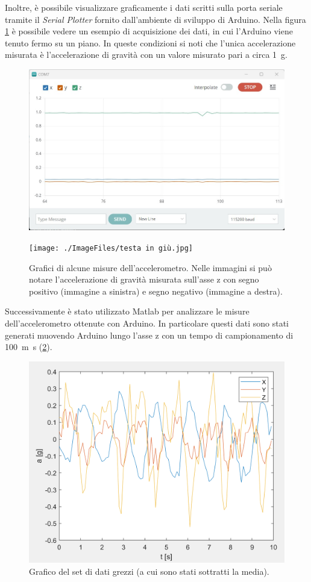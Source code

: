 Inoltre, è possibile visualizzare graficamente i dati scritti sulla porta seriale tramite il \textit{Serial Plotter} fornito dall'ambiente di sviluppo di Arduino. Nella figura \ref{fig:serial_plotter} è possibile vedere un esempio di acquisizione dei dati, in cui l'Arduino viene tenuto fermo su un piano. In queste condizioni si noti che l'unica accelerazione misurata è l'accelerazione di gravità con un valore misurato pari a circa \SI{1}{g}.
\begin{figure}[tbh]
	\centering
	\begin{minipage}{.45\textwidth}
		\includegraphics[width=\linewidth]{./ImageFiles/fermo.jpg}
	\end{minipage}
	\begin{minipage}{.45\textwidth}
		\texttt{[image: ./ImageFiles/testa in giù.jpg]}
	\end{minipage}
	\caption{Grafici di alcune misure dell'accelerometro. Nelle immagini si può notare l'accelerazione di gravità misurata sull'asse z con segno positivo (immagine a sinistra) e segno negativo (immagine a destra).}
	\label{fig:serial_plotter}
\end{figure}
\newpage
Successivamente è stato utilizzato Matlab per analizzare le misure dell'accelerometro ottenute con Arduino. In particolare questi dati sono stati generati muovendo Arduino lungo l'asse z con un tempo di campionamento di \SI{100}{m\second} (\Fig \ref{fig:plot_dati}).
\begin{figure}[h]
	\centering		
	\includegraphics[width=0.6\linewidth]{./ImageFiles/plot1_arr2.png}
	\caption{Grafico del set di dati grezzi (a cui sono stati sottratti la media).}
	\label{fig:plot_dati}
\end{figure}

